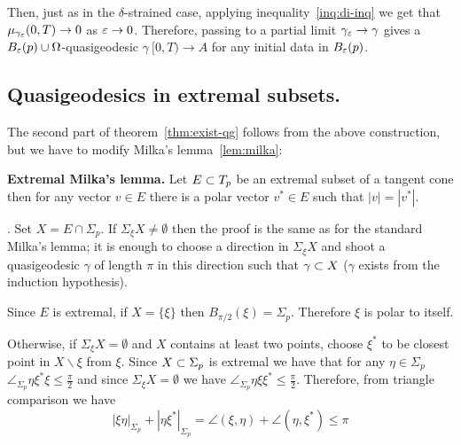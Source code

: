 \documentclass{article}
\begin{document}
Then, just as in the $\delta$-strained case, applying
inequality~\ref{inq:di-inq} we get that $\mu_{\gamma_{\varepsilon}}(0,T)\to0$ as
$\varepsilon\to 0$. 
Therefore, passing to a partial limit $\gamma_\varepsilon\to\gamma$ gives a
$B_\varepsilon(p)\cup\Omega$-quasigeodesic $\gamma\:[0,T)\to A$ for any initial data in
$B_\varepsilon(p)$.
\qeds




\subsection{Quasigeodesics in extremal subsets.}\label{qg-extrim}

The second part of theorem~\ref{thm:exist-qg} follows from the above construction, but we have to
modify Milka's lemma~\ref{lem:milka}:

\begin{thm}{\bf Extremal Milka's lemma.} Let $E\subset T_p$ be an extremal subset of a tangent cone then for any vector $v\in E$ there is a polar vector $v^*\in E$
such that $|v|=|v^*|$.
\end{thm}

\Proof. Set $X=E\cap \Sigma_p$. If $\Sigma_\xi X\not=\emptyset$ then the proof is the
same as for the standard Milka's lemma; it is enough to choose a direction in
$\Sigma_\xi X$ and shoot a quasigeodesic $\gamma$ of length $\pi$ in this direction such that $\gamma\subset X$ ($\gamma$ exists from the induction hypothesis). 

Since $E$ is extremal,
if $X=\{\xi\}$ then $B_{\pi/2}(\xi)=\Sigma_p$. 
Therefore $\xi$ is polar to itself.

Otherwise, if $\Sigma_\xi X=\emptyset$ and $X$ contains at least two points, choose $\xi^*$ to be closest point in $X\backslash\xi$ from $\xi$. 
Since $X\subset \Sigma_p$ is extremal we have that for any $\eta\in \Sigma_p$ $\angle_{\Sigma_p}\eta\xi^*\xi\le\tfrac\pi2$ and since $\Sigma_\xi X=\emptyset$ we have $\angle_{\Sigma_p}\eta\xi\xi^*\le\tfrac\pi2$.
Therefore, from triangle comparison we have
$$|\xi\eta|_{\Sigma_p}+|\eta\xi^*|_{\Sigma_p}
=
\angle(\xi,\eta)+\angle(\eta,\xi^*)\le\pi$$
\qedsf
\end{document}
